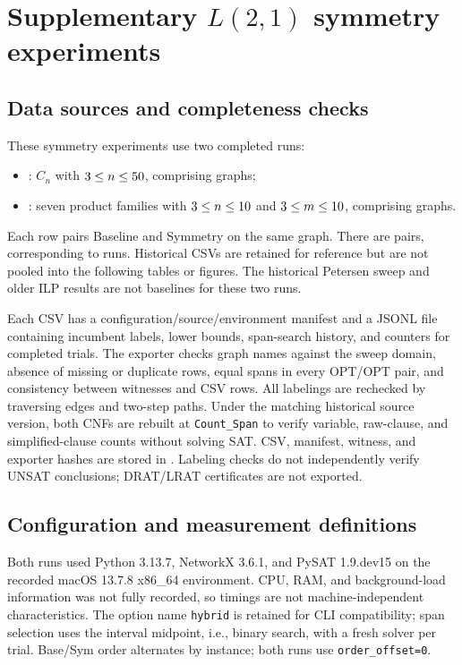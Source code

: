 \section{Supplementary \texorpdfstring{$L(2,1)$}{L(2,1)} symmetry experiments}\label{sec:legacy-experiments}
\subsection{Data sources and completeness checks}
These symmetry experiments use two completed runs:
\begin{itemize}
\item {}: $C_n$ with
$3\leq n\leq50$, comprising \CycleCount{} graphs;
\item {}: seven product families with
$3\leq n\leq10$ and
$3\leq m\leq10$, comprising \ProductCount{} graphs.
\end{itemize}
Each row pairs Baseline and Symmetry on the same graph. There are
\ComparisonCount{} pairs, corresponding to \WitnessCount{} runs. Historical
CSVs are retained for reference but are not pooled into the following tables
or figures. The historical Petersen sweep and older ILP results are not
baselines for these two runs.

Each CSV has a configuration/source/environment manifest and a JSONL file
containing incumbent labels, lower bounds, span-search history, and counters
for completed trials. The exporter checks graph names against the sweep
domain, absence of missing or duplicate rows, equal spans in every OPT/OPT
pair, and consistency between witnesses and CSV rows. All \WitnessCount{}
labelings are rechecked by traversing edges and two-step paths. Under the
matching historical source version, both CNFs are rebuilt at
\texttt{Count\_Span} to verify variable, raw-clause, and simplified-clause
counts without solving SAT. CSV, manifest, witness, and exporter hashes
are stored in . Labeling checks do not
independently verify UNSAT conclusions; DRAT/LRAT certificates are not exported.

\subsection{Configuration and measurement definitions}
\begin{table}[H]
\caption{Archived symmetry-run configurations.}
\centering\small
{}
\end{table}
Both runs used Python 3.13.7, NetworkX 3.6.1, and PySAT 1.9.dev15 on the
recorded macOS 13.7.8 x86\_64 environment. CPU, RAM, and background-load
information was not fully recorded, so timings are not machine-independent
characteristics. The option name \texttt{hybrid} is retained for CLI
compatibility; span selection uses the interval midpoint, i.e., binary search,
with a fresh solver per trial. Base/Sym order alternates by instance;
both runs use \texttt{order\_offset=0}.

